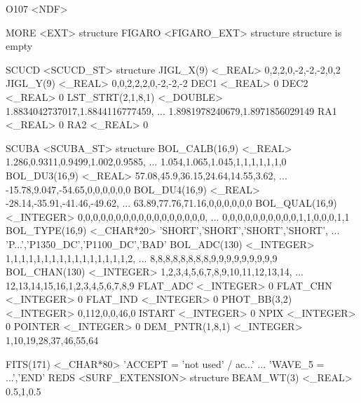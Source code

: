 \documentclass[twoside,11pt,nolof]{starlink}
\begin{document}
\begin{small}
\begin{terminalv}
O107  <NDF>

   MORE           <EXT>           {structure}
      FIGARO         <FIGARO_EXT>    {structure}
         {structure is empty}

      SCUCD          <SCUCD_ST>      {structure}
         JIGL_X(9)      <_REAL>         0,2,2,0,-2,-2,-2,0,2
         JIGL_Y(9)      <_REAL>         0,0,2,2,2,0,-2,-2,-2
         DEC1           <_REAL>         0
         DEC2           <_REAL>         0
         LST_STRT(2,1,8,1)  <_DOUBLE>   1.8834042737017,1.8844116777459,
                                        ... 1.8981978240679,1.8971856029149
         RA1            <_REAL>         0
         RA2            <_REAL>         0

      SCUBA          <SCUBA_ST>      {structure}
         BOL_CALB(16,9)  <_REAL>        1.286,0.9311,0.9499,1.002,0.9585,
                                        ... 1.054,1.065,1.045,1,1,1,1,1,1,0
         BOL_DU3(16,9)  <_REAL>         57.08,45.9,36.15,24.64,14.55,3.62,
                                        ... -15.78,9.047,-54.65,0,0,0,0,0,0
         BOL_DU4(16,9)  <_REAL>         -28.14,-35.91,-41.46,-49.62,
                                        ... 63.89,77.76,71.16,0,0,0,0,0,0
         BOL_QUAL(16,9)  <_INTEGER>     0,0,0,0,0,0,0,0,0,0,0,0,0,0,0,0,0,
                                        ... 0,0,0,0,0,0,0,0,0,0,1,1,0,0,0,1,1
         BOL_TYPE(16,9)  <_CHAR*20>     'SHORT','SHORT','SHORT','SHORT',
                                        ... 'P...','P1350_DC','P1100_DC','BAD'
         BOL_ADC(130)   <_INTEGER>      1,1,1,1,1,1,1,1,1,1,1,1,1,1,1,1,2,
                                        ... 8,8,8,8,8,8,8,8,9,9,9,9,9,9,9,9,9
         BOL_CHAN(130)  <_INTEGER>      1,2,3,4,5,6,7,8,9,10,11,12,13,14,
                                        ... 12,13,14,15,16,1,2,3,4,5,6,7,8,9
         FLAT_ADC       <_INTEGER>      0
         FLAT_CHN       <_INTEGER>      0
         FLAT_IND       <_INTEGER>      0
         PHOT_BB(3,2)   <_INTEGER>      0,112,0,0,46,0
         ISTART         <_INTEGER>      0
         NPIX           <_INTEGER>      0
         POINTER        <_INTEGER>      0
         DEM_PNTR(1,8,1)  <_INTEGER>    1,10,19,28,37,46,55,64

      FITS(171)      <_CHAR*80>      'ACCEPT  = 'not used'           / ac...'
                                     ... 'WAVE_5  =                 ...','END'
      REDS           <SURF_EXTENSION>   {structure}
         BEAM_WT(3)     <_REAL>         0.5,1,0.5


\end{terminalv}
\end{small}
\end{document}

